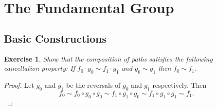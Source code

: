 \documentclass{article}
\newtheorem{exercise}[theorem]{Exercise}
\begin{document}
\section{The Fundamental Group}
\subsection{Basic Constructions}
\begin{exercise}
Show that the composition of paths satisfies the following cancellation property: If $f_0\cdot g_0\sim f_1\cdot g_1$ and $g_0\sim g_1$ then $f_0\sim f_1$.
\end{exercise}
\begin{proof}
Let $\overline{g_0}$ and $\overline{g_1}$ be the reversals of $g_0$ and $g_1$ respectively. Then\[f_0\sim f_0\circ g_0\circ\overline{g_0}\sim f_1\circ g_1\circ \overline{g_0}\sim f_1\circ g_1\circ \overline{g_1}\sim f_1.\]
\end{proof}
\end{document}
